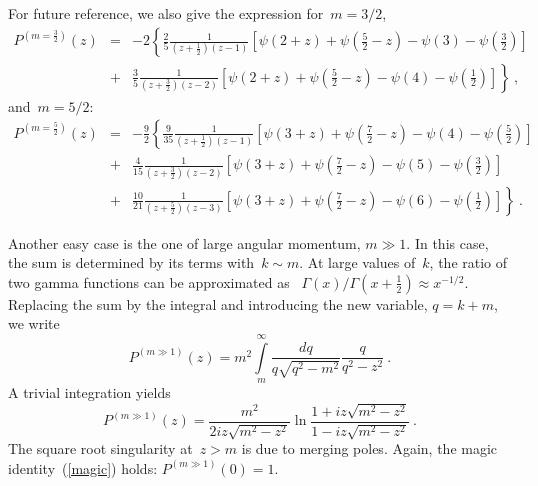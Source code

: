 \documentclass[preprint,aps,prb]{revtex4}
\begin{document}
For future reference, we also give the expression for~$m = 3/2$, 
\begin{eqnarray}
P^{(m = \frac{3}{2})}(z) 
 &=& - 2
  \left\{
    \frac{2}{5} \frac{1}{\left(z + \frac{1}{2}\right)\left(z - 1\right)}
    \left[
       \psi\left(2 + z\right) 
       + \psi\left(\frac{5}{2} - z\right) 
       - \psi\left(3\right) 
       - \psi\left(\frac{3}{2}\right) 
    \right]
  \right.
\nonumber
\\
  &+&
  \left.
    \frac{3}{5} \frac{1}{\left(z + \frac{3}{2}\right)\left(z - 2\right)}
    \left[
       \psi\left(2 + z\right) 
       + \psi\left(\frac{5}{2} - z\right) 
       - \psi\left(4\right) 
       - \psi\left(\frac{1}{2}\right) 
    \right]
  \right\}
\ , 
\end{eqnarray}
and~$m = 5/2$:
\begin{eqnarray}
P^{(m = \frac{5}{2})}(z) 
 &=& - \frac{9}{2} 
  \left\{
    \frac{9}{35} \frac{1}{\left(z + \frac{1}{2}\right)\left(z - 1\right)}
    \left[
       \psi\left(3 + z\right) 
       + \psi\left(\frac{7}{2} - z\right) 
       - \psi\left(4\right) 
       - \psi\left(\frac{5}{2}\right) 
    \right]
  \right.
\nonumber
\\
  &+&
    \frac{4}{15} \frac{1}{\left(z + \frac{3}{2}\right)\left(z - 2\right)}
    \left[
       \psi\left(3 + z\right) 
       + \psi\left(\frac{7}{2} - z\right) 
       - \psi\left(5\right) 
       - \psi\left(\frac{3}{2}\right) 
    \right]
\\
\nonumber
  &+&
  \left.
    \frac{10}{21} \frac{1}{\left(z + \frac{5}{2}\right)\left(z - 3\right)}
    \left[
       \psi\left(3 + z\right) 
       + \psi\left(\frac{7}{2} - z\right) 
       - \psi\left(6\right) 
       - \psi\left(\frac{1}{2}\right) 
    \right]
  \right\}
\ .
\end{eqnarray}

Another easy case is the one of large angular momentum, $m \gg 1$.
In this case, the sum is determined by its terms with~$k \sim m$. 
At large values of~$k$, 
the ratio of two gamma functions can be approximated as
~$\Gamma(x)/\Gamma\left(x + \frac{1}{2}\right) \approx x^{-1/2}$.
Replacing the sum by the integral and introducing the 
new variable, $q = k + m$, we write
\begin{equation}
P^{(m \gg 1)}(z) = m^2 \int\limits_{m}^{\infty}
\frac{dq}{q\sqrt{q^2 - m^2}} \frac{q}{q^2 - z^2}
\ .
\end{equation}
A trivial integration yields
\begin{equation}
P^{(m \gg 1)}(z) = \frac{m^2}{2iz \sqrt{m^2 - z^2}} 
\ln\frac{1 + i z \sqrt{m^2 - z^2}}{1 - iz \sqrt{m^2 - z^2}}
\ .
\end{equation}
The square root singularity at~$z > m$ is due to merging poles. 
Again, the magic identity~(\ref{magic}) holds: $P^{(m \gg 1)}(0) = 1$.
\end{document}
